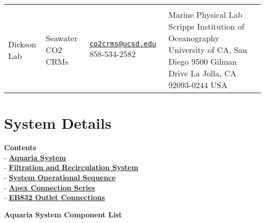 \documentclass[]{book}
\begin{document}
\begin{longtable}[]{@{}llll@{}}
\begin{minipage}[t]{0.06\columnwidth}
\end{minipage}\tabularnewline
\begin{minipage}[t]{0.06\columnwidth}\raggedright\strut
Dickson Lab\strut
\end{minipage} & \begin{minipage}[t]{0.06\columnwidth}\raggedright\strut
Seawater CO2 CRMs\strut
\end{minipage} & \begin{minipage}[t]{0.06\columnwidth}\raggedright\strut
\href{mailto:co2crms@ucsd.edu}{\nolinkurl{co2crms@ucsd.edu}}
858-534-2582\strut
\end{minipage} & \begin{minipage}[t]{0.06\columnwidth}\raggedright\strut
Marine Physical Lab Scripps Institution of Oceanography University of
CA, San Diego 9500 Gilman Drive La Jolla, CA 92093-0244 USA\strut
\end{minipage}\tabularnewline
\bottomrule
\end{longtable}

\hypertarget{system-details}{\chapter{System
Details}\label{system-details}}

\textbf{Contents}\\
- \protect\hyperlink{Aquaria_System_List}{\textbf{Aquaria System}}\\
-
\protect\hyperlink{Filtration_and_Recirculation_System}{\textbf{Filtration
and Recirculation System}}\\
- \protect\hyperlink{System_Operational_Sequence}{\textbf{System
Operational Sequence}}\\
- \protect\hyperlink{Apex_Connection_Series}{\textbf{Apex Connection
Series}}\\
- \protect\hyperlink{EB832_Outlet_Connections}{\textbf{EB832 Outlet
Connections}}

 \textbf{Aquaria System Component List}
\end{document}
